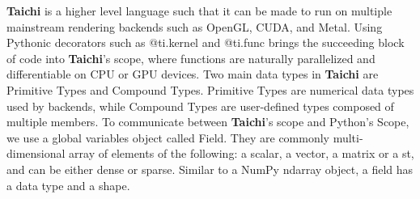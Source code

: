 \documentclass[acmtog]{acmart}
\begin{document}
\textbf{Taichi} is a higher level language such that it can be made to run on multiple mainstream rendering backends such as OpenGL, CUDA, and Metal. Using Pythonic decorators such as @ti.kernel and @ti.func brings the succeeding block of code into \textbf{Taichi}'s scope, where functions are naturally parallelized and differentiable on CPU or GPU devices. Two main data types in \textbf{Taichi} are Primitive Types and Compound Types. Primitive Types are numerical data types used by backends, while Compound Types are user-defined types composed of multiple members. To communicate between \textbf{Taichi}'s scope and Python's Scope, we use a global variables object called Field. They are commonly multi-dimensional array of elements of the following: a scalar, a vector, a matrix or a st, and can be either dense or sparse. Similar to a NumPy ndarray object, a field has a data type and a shape.
\end{document}
